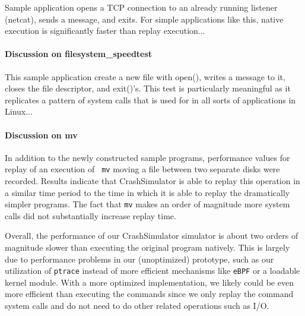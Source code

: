 Sample application opens a TCP connection to an already running listener (netcat), sends a message, and
exits. For simple applications like this, native execution is significantly faster than replay execution...

\paragraph{Discussion on filesystem\_speedtest}

This sample application create a new file with open(), writes a message to it, closes the file descriptor, and
exit()'s. This test is particularly meaningful as it replicates a pattern of system calls that is used for in
all sorts of applications in Linux...

\paragraph{Discussion on mv}

In addition to the newly constructed sample programs, performance values for replay of an execution of {\tt
  mv} moving a file between two separate disks were recorded.  Results indicate that CrashSimulator is able to
replay this operation in a similar time period to the time in which it is able to replay the dramatically
simpler programs.  The fact that {\tt mv} makes an order of magnitude more system calls did not substantially
increase replay time.


Overall, the performance of our CrashSimulator simulator is about two orders of
magnitude slower than executing the original program natively.  This is 
largely due to performance problems in our (unoptimized) prototype, such as
our utilization of {\tt ptrace} instead of more efficient mechanisms like
{\tt eBPF} or a loadable kernel module.  With a more optimized
implementation, we likely could be even more efficient than executing the
commands since we only replay the command system calls and do not need to
do other related operations such as I/O.
